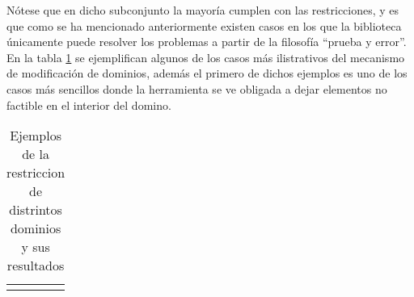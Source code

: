 Nótese que en dicho subconjunto la mayoría cumplen con las restricciones, y es que como se ha mencionado anteriormente existen
casos en los que la biblioteca únicamente puede resolver los problemas a partir de la filosofía “prueba y error”. En la 
tabla \ref{chap2:examples} se ejemplifican algunos de los casos más ilistrativos del mecanismo de modificación de dominios, además el primero de dichos
ejemplos es uno de los casos más sencillos donde la herramienta se ve obligada a dejar elementos no factible en el interior del
domino.

\setlength\LTleft{-3cm}
\setlength\LTright{-5cm}
\begin{longtable}{ | p{6cm} | p{2cm}| p{3.5cm}| p{6.5cm}|  }
    \caption{Ejemplos de la restriccion de distrintos dominios y sus resultados }\label{chap2:examples} \\
    \endfirsthead
    \hline
    \endhead
    \hline
    \endfoot
    \hline
    \endlastfoot


\end{longtable}
